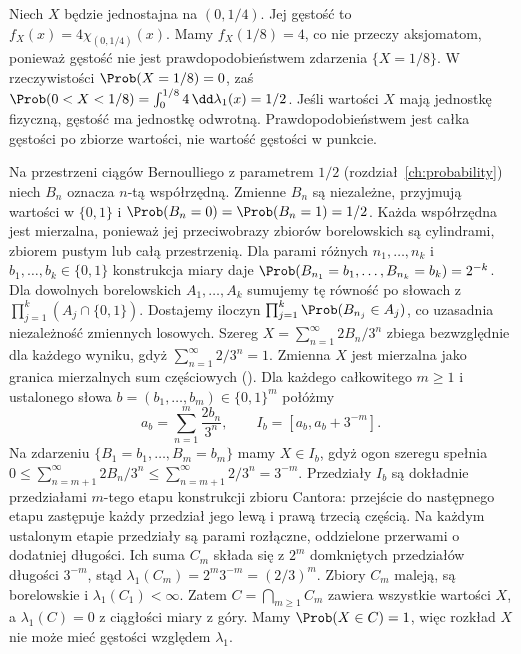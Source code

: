 \begin{przyklad}
Niech $X$ będzie jednostajna na $(0,1/4)$. Jej gęstość
to $f_X(x)=4\chi_{(0,1/4)}(x)$. Mamy $f_X(1/8)=4$,
co nie przeczy aksjomatom, ponieważ gęstość nie jest
prawdopodobieństwem zdarzenia $\{X=1/8\}$.
W rzeczywistości $\Prob(X=1/8)=0$, zaś
$\Prob(0<X<1/8)=\int_0^{1/8}4\,\dd\lambda_1(x)=1/2$.
Jeśli wartości $X$ mają jednostkę fizyczną, gęstość ma
jednostkę odwrotną. Prawdopodobieństwem jest całka gęstości
po zbiorze wartości, nie wartość gęstości w punkcie.
\end{przyklad}

\begin{przyklad}
Na przestrzeni ciągów Bernoulliego z parametrem $1/2$
(rozdział~\ref{ch:probability}) niech $B_n$ oznacza $n$-tą
współrzędną. Zmienne $B_n$ są niezależne, przyjmują wartości
w $\{0,1\}$ i $\Prob(B_n=0)=\Prob(B_n=1)=1/2$.
Każda współrzędna jest mierzalna, ponieważ jej przeciwobrazy
zbiorów borelowskich są cylindrami, zbiorem pustym lub całą
przestrzenią. Dla parami różnych $n_1,\ldots,n_k$ i
$b_1,\ldots,b_k\in\{0,1\}$ konstrukcja miary daje
$\Prob(B_{n_1}=b_1,\ldots,B_{n_k}=b_k)=2^{-k}$.
Dla dowolnych borelowskich $A_1,\ldots,A_k$ sumujemy tę
równość po słowach z $\prod_{j=1}^k(A_j\cap\{0,1\})$.
Dostajemy iloczyn $\prod_{j=1}^k\Prob(B_{n_j}\in A_j)$,
co uzasadnia niezależność zmiennych losowych.
Szereg $X=\sum_{n=1}^\infty 2B_n/3^n$ zbiega bezwzględnie
dla każdego wyniku, gdyż $\sum_{n=1}^\infty 2/3^n=1$.
Zmienna $X$ jest mierzalna jako granica mierzalnych sum częściowych
().
Dla każdego całkowitego $m\geq1$ i ustalonego słowa
$b=(b_1,\ldots,b_m)\in\{0,1\}^m$ połóżmy
\[
a_b=\sum_{n=1}^m\frac{2b_n}{3^n},\qquad
I_b=[a_b,a_b+3^{-m}].
\]
Na zdarzeniu $\{B_1=b_1,\ldots,B_m=b_m\}$ mamy $X\in I_b$,
gdyż ogon szeregu spełnia
$0\leq\sum_{n=m+1}^\infty 2B_n/3^n\leq
\sum_{n=m+1}^\infty 2/3^n=3^{-m}$.
Przedziały $I_b$ są dokładnie przedziałami $m$-tego etapu
konstrukcji zbioru Cantora: przejście do następnego etapu
zastępuje każdy przedział jego lewą i prawą trzecią częścią.
Na każdym ustalonym etapie przedziały są parami rozłączne,
oddzielone przerwami o dodatniej długości.
Ich suma $C_m$ składa się z $2^m$ domkniętych przedziałów
długości $3^{-m}$, stąd $\lambda_1(C_m)=2^m3^{-m}=(2/3)^m$.
Zbiory $C_m$ maleją, są borelowskie i $\lambda_1(C_1)<\infty$.
Zatem $C=\bigcap_{m\geq1}C_m$ zawiera wszystkie wartości $X$,
a $\lambda_1(C)=0$ z ciągłości miary z góry.
Mamy $\Prob(X\in C)=1$, więc rozkład $X$ nie może mieć
gęstości względem $\lambda_1$.


\end{przyklad}
